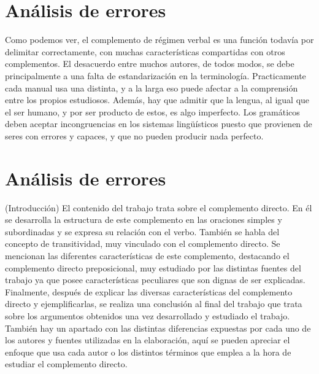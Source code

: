 \documentclass[12pt, a4paper, oneside]{report}
\begin{document}

\section{Análisis de errores}
Como podemos ver, %
el complemento de régimen verbal es una función todavía por %
delimitar correctamente, con muchas características
compartidas con otros complementos. El desacuerdo entre muchos
autores, de todos modos, %
 se debe principalmente a una falta de estandarización
en la terminología. Practicamente %
 cada manual usa una distinta, y a la larga eso puede
afectar a la comprensión entre los propios
estudiosos. Además, hay que admitir que la
lengua, al igual que el ser humano, y por ser
producto de estos, es algo imperfecto. Los
gramáticos deben aceptar incongruencias en
los sistemas lingüísticos puesto que provienen de seres con errores y capaces,
y que no pueden producir nada perfecto.

\section{Análisis de errores}
(Introducción)
El contenido del trabajo trata sobre el complemento directo. %
En él se desarrolla la estructura de este complemento en las
oraciones simples y subordinadas y se expresa su relación con el
verbo.
También se habla del concepto de transitividad, muy vinculado
con el complemento directo.
Se
mencionan
las
diferentes
características
de
este
complemento, destacando el complemento directo preposicional,
muy estudiado por las distintas fuentes del trabajo ya que posee
características peculiares que son dignas de ser explicadas.
Finalmente, después de explicar las diversas características del
complemento directo y ejempliﬁcarlas, se realiza una conclusión
al ﬁnal del trabajo que trata sobre los argumentos obtenidos una
vez desarrollado y estudiado el trabajo. También hay un apartado
con las distintas diferencias expuestas por cada uno de los autores
y fuentes utilizadas en la elaboración, aquí se pueden apreciar el
enfoque que usa cada autor o los distintos términos que emplea a
la hora de estudiar el complemento directo.
\clearpage

\end{document}
